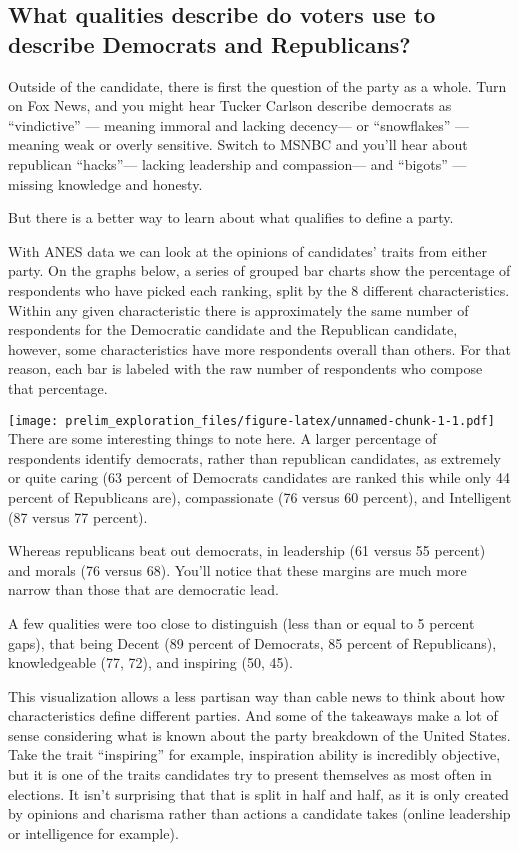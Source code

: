 \documentclass[
]{article}
\begin{document}
\hypertarget{what-qualities-describe-do-voters-use-to-describe-democrats-and-republicans}{%
\subsection{What qualities describe do voters use to describe Democrats
and
Republicans?}\label{what-qualities-describe-do-voters-use-to-describe-democrats-and-republicans}}

Outside of the candidate, there is first the question of the party as a
whole. Turn on Fox News, and you might hear Tucker Carlson describe
democrats as ``vindictive'' --- meaning immoral and lacking decency---
or ``snowflakes'' --- meaning weak or overly sensitive. Switch to MSNBC
and you'll hear about republican ``hacks''--- lacking leadership and
compassion--- and ``bigots'' --- missing knowledge and honesty.

But there is a better way to learn about what qualifies to define a
party.

With ANES data we can look at the opinions of candidates' traits from
either party. On the graphs below, a series of grouped bar charts show
the percentage of respondents who have picked each ranking, split by the
8 different characteristics. Within any given characteristic there is
approximately the same number of respondents for the Democratic
candidate and the Republican candidate, however, some characteristics
have more respondents overall than others. For that reason, each bar is
labeled with the raw number of respondents who compose that percentage.

\texttt{[image: prelim\_exploration\_files/figure-latex/unnamed-chunk-1-1.pdf]}
There are some interesting things to note here. A larger percentage of
respondents identify democrats, rather than republican candidates, as
extremely or quite caring (63 percent of Democrats candidates are ranked
this while only 44 percent of Republicans are), compassionate (76 versus
60 percent), and Intelligent (87 versus 77 percent).

Whereas republicans beat out democrats, in leadership (61 versus 55
percent) and morals (76 versus 68). You'll notice that these margins are
much more narrow than those that are democratic lead.

A few qualities were too close to distinguish (less than or equal to 5
percent gaps), that being Decent (89 percent of Democrats, 85 percent of
Republicans), knowledgeable (77, 72), and inspiring (50, 45).

This visualization allows a less partisan way than cable news to think
about how characteristics define different parties. And some of the
takeaways make a lot of sense considering what is known about the party
breakdown of the United States. Take the trait ``inspiring'' for
example, inspiration ability is incredibly objective, but it is one of
the traits candidates try to present themselves as most often in
elections. It isn't surprising that that is split in half and half, as
it is only created by opinions and charisma rather than actions a
candidate takes (online leadership or intelligence for example).
\end{document}
